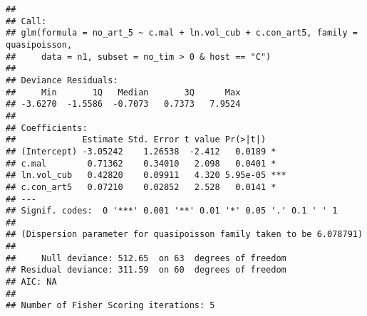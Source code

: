 \documentclass[]{article}
\newenvironment{Shaded}{\begin{snugshade}}{\end{snugshade}}
\newcommand{\KeywordTok}[1]{\textcolor[rgb]{0.13,0.29,0.53}{\textbf{#1}}}
\newcommand{\DataTypeTok}[1]{\textcolor[rgb]{0.13,0.29,0.53}{#1}}
\newcommand{\DecValTok}[1]{\textcolor[rgb]{0.00,0.00,0.81}{#1}}
\newcommand{\StringTok}[1]{\textcolor[rgb]{0.31,0.60,0.02}{#1}}
\newcommand{\OperatorTok}[1]{\textcolor[rgb]{0.81,0.36,0.00}{\textbf{#1}}}
\newcommand{\NormalTok}[1]{#1}
\begin{document}
\begin{verbatim}
## 
## Call:
## glm(formula = no_art_5 ~ c.mal + ln.vol_cub + c.con_art5, family = quasipoisson, 
##     data = n1, subset = no_tim > 0 & host == "C")
## 
## Deviance Residuals: 
##     Min       1Q   Median       3Q      Max  
## -3.6270  -1.5586  -0.7073   0.7373   7.9524  
## 
## Coefficients:
##             Estimate Std. Error t value Pr(>|t|)    
## (Intercept) -3.05242    1.26538  -2.412   0.0189 *  
## c.mal        0.71362    0.34010   2.098   0.0401 *  
## ln.vol_cub   0.42820    0.09911   4.320 5.95e-05 ***
## c.con_art5   0.07210    0.02852   2.528   0.0141 *  
## ---
## Signif. codes:  0 '***' 0.001 '**' 0.01 '*' 0.05 '.' 0.1 ' ' 1
## 
## (Dispersion parameter for quasipoisson family taken to be 6.078791)
## 
##     Null deviance: 512.65  on 63  degrees of freedom
## Residual deviance: 311.59  on 60  degrees of freedom
## AIC: NA
## 
## Number of Fisher Scoring iterations: 5
\end{verbatim}

\begin{Shaded}
\end{Shaded}
\end{document}
